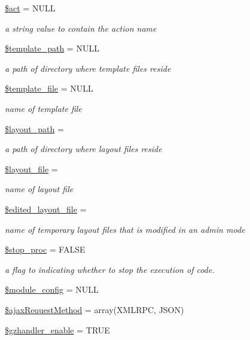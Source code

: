 \begin{DoxyCompactItemize}
\hyperlink{classModuleObject_a9d43905d072c53cd5cd239d706215895}{\$act} = N\+U\+LL
\begin{DoxyCompactList}\small\item\em a string value to contain the action name \end{DoxyCompactList}\item 
\hyperlink{classModuleObject_a8a632bae853adef8e2ab9596a3a86661}{\$template\+\_\+path} = N\+U\+LL
\begin{DoxyCompactList}\small\item\em a path of directory where template files reside \end{DoxyCompactList}\item 
\hyperlink{classModuleObject_a6eddf08e627527affc7e835a6d302733}{\$template\+\_\+file} = N\+U\+LL
\begin{DoxyCompactList}\small\item\em name of template file \end{DoxyCompactList}\item 
\hyperlink{classModuleObject_ada660958e777413d332337fba67d657f}{\$layout\+\_\+path} = \textquotesingle{}\textquotesingle{}
\begin{DoxyCompactList}\small\item\em a path of directory where layout files reside \end{DoxyCompactList}\item 
\hyperlink{classModuleObject_a2a1677b06eb7b3ff04ff19e960a64e08}{\$layout\+\_\+file} = \textquotesingle{}\textquotesingle{}
\begin{DoxyCompactList}\small\item\em name of layout file \end{DoxyCompactList}\item 
\hyperlink{classModuleObject_a1fcbb01c627ce5ff104c05f54715bd61}{\$edited\+\_\+layout\+\_\+file} = \textquotesingle{}\textquotesingle{}
\begin{DoxyCompactList}\small\item\em name of temporary layout files that is modified in an admin mode \end{DoxyCompactList}\item 
\hyperlink{classModuleObject_ad4efa1b4c623247763e4d56f76c5fb1c}{\$stop\+\_\+proc} = F\+A\+L\+SE
\begin{DoxyCompactList}\small\item\em a flag to indicating whether to stop the execution of code. \end{DoxyCompactList}\item 
\hyperlink{classModuleObject_aed2cac16f365c2b463772e3eeb0c1402}{\$module\+\_\+config} = N\+U\+LL
\item 
\hyperlink{classModuleObject_a783d38cb68310dc6e5a1f6c1cc6c6b84}{\$ajax\+Request\+Method} = array(\textquotesingle{}X\+M\+L\+R\+PC\textquotesingle{}, \textquotesingle{}J\+S\+ON\textquotesingle{})
\item 
\hyperlink{classModuleObject_acda88247a161a0ddf878e8f504909329}{\$gzhandler\+\_\+enable} = T\+R\+UE
\end{DoxyCompactItemize}


